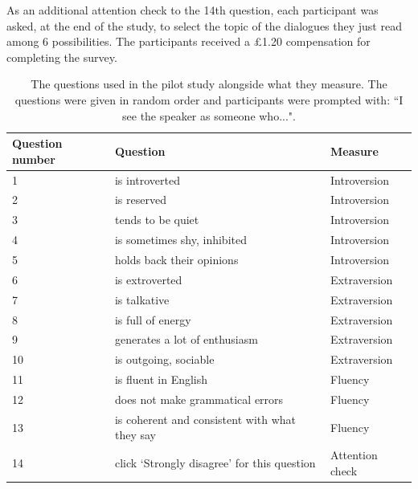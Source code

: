 \documentclass[nomenclature, english, biblatex]{kththesis}
\begin{document}
As an additional attention check to the 14th question, each participant was asked, at the end of the study, to select the topic of the dialogues they just read among 6 possibilities. The participants received a £1.20 compensation for completing the survey.
\begin{table}
    \centering
    \begin{adjustbox}{max width=\textwidth}
        \begin{tabular}{|p{}|p{}|p{}|}
        \hline
        Question number & Question & Measure \\
        \hline
        \hline
        1 & is introverted & Introversion \\
        \hline
        2 & is reserved & Introversion \\
        \hline
        3 & tends to be quiet & Introversion \\
        \hline
        4 & is sometimes shy, inhibited & Introversion \\
        \hline
        5 & holds back their opinions & Introversion \\
        \hline
        6 & is extroverted & Extraversion \\
        \hline
        7 & is talkative & Extraversion \\
        \hline
        8 & is full of energy & Extraversion \\
        \hline
        9 & generates a lot of enthusiasm & Extraversion \\
        \hline
        10 & is outgoing, sociable & Extraversion \\
        \hline
        11 & is fluent in English & Fluency \\
        \hline
        12 & does not make grammatical errors & Fluency \\
        \hline
        13 & is coherent and consistent with what they say & Fluency \\
        \hline
        14 & click `Strongly disagree' for this question & Attention check\\
        \hline
        \end{tabular}
    \end{adjustbox}
    \caption{The questions used in the pilot study alongside what they measure. The questions were given in random order and participants were prompted with: ``I see the speaker as someone who...".}
    \label{tab:pilot_survey}
\end{table}
\end{document}
